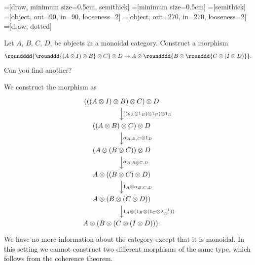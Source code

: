 \def\pathToRoot{../../}

\DeclareMathOperator{\myIn}{in}

\usetikzlibrary{fit}
\usetikzlibrary{knots}
\usetikzlibrary{hobby}
=[draw, minimum size=0.5cm, semithick]
=[minimum size=0.5cm]
=[semithick]
=[object, out=90, in=90, looseness=2]
=[object, out=270, in=270, looseness=2]
=[draw, dotted]

\graphicspath{{graphics/}}



\author{Felix Rech}


\begin{exercise}
  Let $A$, $B$, $C$, $D$, be objects in a monoidal category.
  Construct a morphism
  \[
    \roundddd{\rounddd{(A \otimes I) \otimes B} \otimes C} \otimes D
    \to A \otimes \roundddd{B \otimes \rounddd{C \otimes (I \otimes D)}}.
  \]
  Can you find another?
\end{exercise}

\begin{answer}
  We construct the morphism as
  \[ \begin{tikzcd}
    (((A \otimes I) \otimes B) \otimes C) \otimes D
      \arrow[d, "((\rho_A \otimes 1_B) \otimes 1_C) \otimes 1_D"] \\
    ((A \otimes B) \otimes C) \otimes D
      \arrow[d, "\alpha_{A, B, C} \otimes 1_D"] \\
    (A \otimes (B \otimes C)) \otimes D
      \arrow[d, "\alpha_{A, B \otimes C, D}"] \\
    A \otimes ((B \otimes C) \otimes D)
      \arrow[d, "1_A \otimes \alpha_{B, C, D}"] \\
    A \otimes (B \otimes (C \otimes D))
      \arrow[d, "1_A \otimes (1_B \otimes (1_C \otimes \lambda_D^{-1}))"] \\
    A \otimes (B \otimes (C \otimes (I \otimes D))).
  \end{tikzcd} \]
  We have no more information about the category except that it is monoidal.
  In this setting we cannot construct two different morphisms of the same type, which follows from the coherence theorem.
\end{answer}


